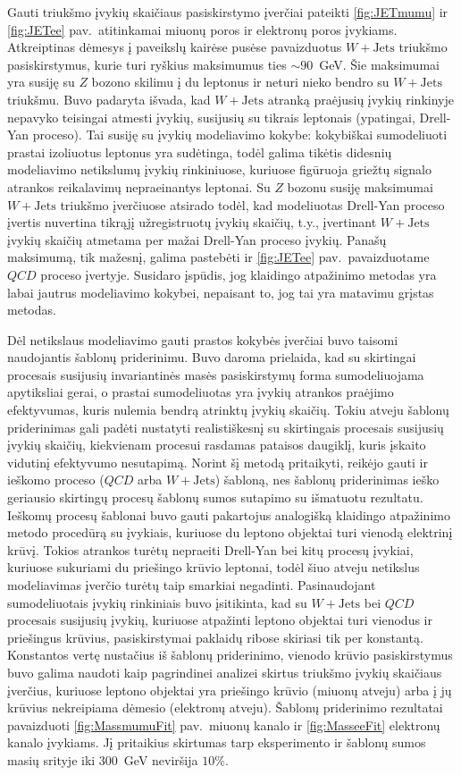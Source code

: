 \documentclass[a4paper, 12pt, oneside]{article}
\newcommand{\WJets}{W\! +\!\mathrm{Jets}}
\newcommand{\QCD}{QC\! D}
\begin{document}
Gauti triukšmo įvykių skaičiaus pasiskirstymo įverčiai pateikti \ref{fig:JETmumu} ir \ref{fig:JETee} pav.\ atitinkamai
miuonų poros ir elektronų poros įvykiams.
Atkreiptinas dėmesys į paveikslų kairėse pusėse pavaizduotus $\WJets$ triukšmo pasiskirstymus, kurie turi ryškius
maksimumus ties $\sim\!90$~GeV.
Šie maksimumai yra susiję su $Z$ bozono skilimu į du leptonus ir neturi nieko bendro su $\WJets$ triukšmu.
Buvo padaryta išvada, kad $\WJets$ atranką praėjusių įvykių rinkinyje nepavyko teisingai atmesti įvykių, susijusių
su tikrais leptonais (ypatingai, Drell-Yan proceso).
Tai susiję su įvykių modeliavimo kokybe: kokybiškai sumodeliuoti prastai izoliuotus leptonus yra sudėtinga, todėl galima
tikėtis didesnių modeliavimo netikslumų įvykių rinkiniuose, kuriuose figūruoja griežtų signalo atrankos reikalavimų nepraeinantys leptonai.
Su $Z$ bozonu susiję maksimumai $\WJets$ triukšmo įverčiuose atsirado todėl, kad modeliuotas Drell-Yan proceso įvertis
nuvertina tikrąjį užregistruotų įvykių skaičių, t.y., įvertinant $\WJets$ įvykių skaičių atmetama per mažai Drell-Yan proceso
įvykių.
Panašų maksimumą, tik mažesnį, galima pastebėti ir \ref{fig:JETee} pav.\ pavaizduotame $\QCD$ proceso įvertyje.
Susidaro įspūdis, jog klaidingo atpažinimo metodas yra labai jautrus modeliavimo kokybei, nepaisant to, jog tai yra matavimu grįstas metodas.

Dėl netikslaus modeliavimo gauti prastos kokybės įverčiai buvo taisomi naudojantis šablonų priderinimu.
Buvo daroma prielaida, kad su skirtingai procesais susijusių invariantinės masės pasiskirstymų forma sumodeliuojama
apytiksliai gerai, o prastai sumodeliuotas yra įvykių atrankos praėjimo efektyvumas, kuris nulemia bendrą atrinktų įvykių skaičių.
Tokiu atveju šablonų priderinimas gali padėti nustatyti realistiškesnį su skirtingais procesais susijusių įvykių skaičių,
kiekvienam procesui rasdamas pataisos daugiklį, kuris įskaito vidutinį efektyvumo nesutapimą.
Norint šį metodą pritaikyti, reikėjo gauti ir ieškomo proceso ($\QCD$ arba $\WJets$) šabloną, nes šablonų priderinimas
ieško geriausio skirtingų procesų šablonų sumos sutapimo su išmatuotu rezultatu.
Ieškomų procesų šablonai buvo gauti pakartojus analogišką klaidingo atpažinimo metodo procedūrą su įvykiais, kuriuose du
leptono objektai turi vienodą elektrinį krūvį.
Tokios atrankos turėtų nepraeiti Drell-Yan bei kitų procesų įvykiai, kuriuose sukuriami du priešingo krūvio leptonai, todėl šiuo
atveju netikslus modeliavimas įverčio turėtų taip smarkiai negadinti.
Pasinaudojant sumodeliuotais įvykių rinkiniais buvo įsitikinta, kad su $\WJets$ bei $\QCD$ procesais susijusių įvykių, kuriuose
atpažinti leptono objektai turi vienodus ir priešingus krūvius, pasiskirstymai paklaidų ribose skiriasi tik per konstantą.
Konstantos vertę nustačius iš šablonų priderinimo, vienodo krūvio pasiskirstymus buvo galima naudoti kaip pagrindinei analizei skirtus
triukšmo įvykių skaičiaus įverčius, kuriuose leptono objektai yra priešingo krūvio (miuonų atveju) arba į jų krūvius nekreipiama
dėmesio (elektronų atveju).
Šablonų priderinimo rezultatai pavaizduoti \ref{fig:MassmumuFit} pav.\ miuonų kanalo ir \ref{fig:MasseeFit} elektronų kanalo įvykiams.
Jį pritaikius skirtumas tarp eksperimento ir šablonų sumos masių srityje iki $300$~GeV neviršija $10\%$.
\end{document}
